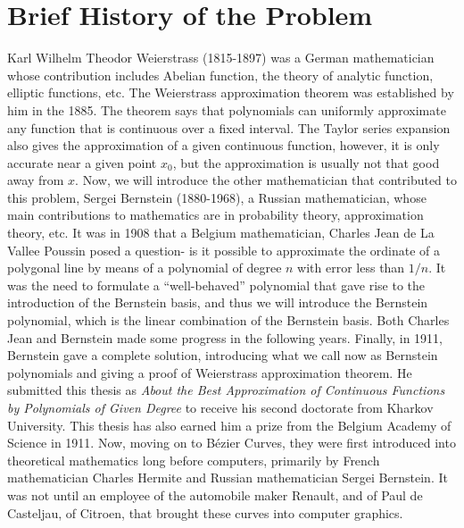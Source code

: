 \documentclass{article}
\begin{document}
\section{Brief History of the Problem}\label{sec:hist}
Karl Wilhelm Theodor Weierstrass (1815-1897) was a German mathematician whose contribution includes Abelian function, the theory of analytic function, elliptic functions, etc.
The Weierstrass approximation theorem was established by him in the 1885. 
The theorem says that polynomials can uniformly approximate any function that is continuous over a fixed interval.
The Taylor series expansion also gives the approximation of a given continuous function, however, it is only accurate near a given point $x_0$, but the approximation is usually not that good away from $x$.
Now, we will introduce the other mathematician that contributed to this problem, Sergei Bernstein (1880-1968), a Russian mathematician, whose main contributions to mathematics are in probability theory, approximation theory, etc. 
It was in 1908 that a Belgium mathematician, Charles Jean de La Vallee Poussin posed a question- is it possible to approximate the ordinate of a polygonal line by means of a polynomial of degree $n$ with error less than $1/n$.
It was the need to formulate a ``well-behaved'' polynomial that gave rise to the introduction of the Bernstein basis, and thus we will introduce the Bernstein polynomial, which is the linear combination of the Bernstein basis.
Both Charles Jean and Bernstein made some progress in the following years.
Finally, in 1911, Bernstein gave a complete solution, introducing what we call now as Bernstein polynomials and giving a proof of Weierstrass approximation theorem.
He submitted this thesis as \textit{About the Best Approximation of Continuous Functions by Polynomials of Given Degree} to receive his second doctorate from Kharkov University.
This thesis has also earned him a prize from the Belgium Academy of Science in 1911.\cite{o'connor_robertson_2010}
Now, moving on to B\'ezier Curves, they were first introduced into theoretical mathematics long before computers, primarily by French mathematician Charles Hermite and Russian mathematician Sergei Bernstein.
It was not until an employee of the automobile maker Renault, and of Paul de Casteljau, of Citroen, that brought these curves into computer graphics.\cite{farouki2012bernstein}
\end{document}
